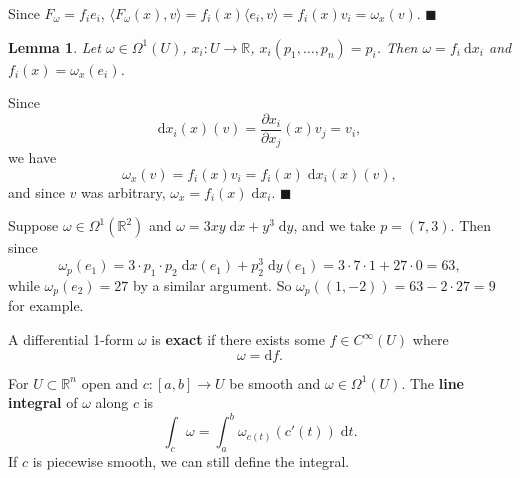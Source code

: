 \documentclass[letter-paper]{tufte-book}
\newtheorem{lemma}[theorem]{\color{pastel-blue}Lemma}
\newenvironment{proof}[1][Proof]{\begin{trivlist}
\item[\hskip \labelsep {\bfseries #1}]}{\end{trivlist}}
\newenvironment{example}[1][Example]{\begin{trivlist}
\item[\hskip \labelsep {\bfseries #1}]}{\end{trivlist}}
\newcommand{\qed}{\hfill$\blacksquare$}
\begin{document}
\begin{proof}
  Since $F_\omega = f_i e_i$, $\langle F_\omega(x), v\rangle = f_i(x) \langle
  e_i, v\rangle = f_i(x) v_i = \omega_x(v)$. \qed
\end{proof}

\begin{lemma}
  Let $\omega \in \Omega^1(U)$, $x_i : U \to \mathbb{R}$, $x_i(p_1, \ldots, p_n)
  = p_i$. Then $\omega = f_i\ \mathrm{d}x_i$ and $f_i(x) = \omega_x (e_i)$.
\end{lemma}

\begin{proof}
  Since
  \begin{equation*}
    \mathrm{d}x_i(x)(v) = \frac{\partial x_i}{\partial x_j}(x)v_j = v_i,
  \end{equation*}
  we have
  \begin{equation*}
    \omega_x(v) = f_i(x) v_i = f_i(x)\; \mathrm{d}x_i(x)(v),
  \end{equation*}
  and since $v$ was arbitrary, $\omega_x = f_i(x)\; \mathrm{d}x_i$. \qed
\end{proof}

\begin{example}
  Suppose $\omega \in \Omega^1(\mathbb{R}^2)$ and $\omega = 3xy\; \mathrm{d}x +
  y^3\; \mathrm{d}y$, and we take $p = (7,3)$. Then since
  \begin{equation*}
    \omega_p(e_1) = 3\cdot p_1\cdot p_2\; \mathrm{d}x(e_1) + p_2^3\; \mathrm{d}y(e_1) = 3\cdot7\cdot1 + 27\cdot 0 = 63,
  \end{equation*}
  while $\omega_p(e_2) = 27$ by a similar argument. So $\omega_p((1, -2)) = 63 -
  2\cdot27=9$ for example.
\end{example}

A differential 1-form $\omega$ is \textbf{exact} if there exists some $f \in
C^\infty(U)$ where
\begin{equation}
  \omega = \mathrm{d}f.
\end{equation}

For $U \subset \mathbb{R}^n$ open and $c:[a,b] \to U$ be smooth and $\omega \in
\Omega^1(U)$. The \textbf{line integral} of $\omega$ along $c$ is
\begin{equation}
  \int_c \omega = \int_a^b \omega_{c(t)} \left(c'(t)\right)\; \mathrm{d}t.
\end{equation}
If $c$ is piecewise smooth, we can still define the integral.
\end{document}

